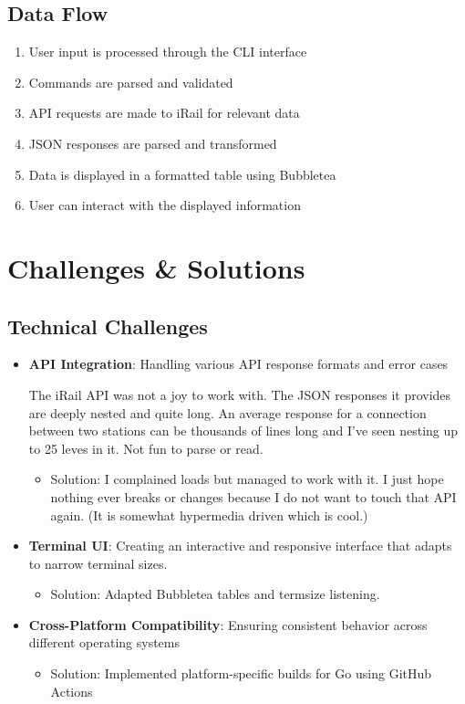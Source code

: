 \documentclass[10pt,a4paper]{article}
\begin{document}
\subsection{Data Flow}
\begin{enumerate}
	\item User input is processed through the CLI interface
	\item Commands are parsed and validated
	\item API requests are made to iRail for relevant data
	\item JSON responses are parsed and transformed
	\item Data is displayed in a formatted table using Bubbletea
	\item User can interact with the displayed information
\end{enumerate}

\section{Challenges \& Solutions}
\subsection{Technical Challenges}
\begin{itemize}
	\item \textbf{API Integration}: Handling various API response formats and error cases

	      The iRail API was not a joy to work with. The JSON responses it provides are deeply nested and quite long. An average response for a connection between two stations can be thousands of lines long and I've seen nesting up to 25 leves in it. Not
	      fun to parse or read.
	      \begin{itemize}
		      \item Solution: I complained loads but managed to work with it. I just hope nothing ever breaks or changes because I do not want to touch that API again. (It is somewhat hypermedia driven which is cool.)
	      \end{itemize}
	\item \textbf{Terminal UI}: Creating an interactive and responsive interface that adapts to narrow terminal sizes.
	      \begin{itemize}
		      \item Solution: Adapted Bubbletea tables and termsize listening.
	      \end{itemize}
	\item \textbf{Cross-Platform Compatibility}: Ensuring consistent behavior across different operating systems
	      \begin{itemize}
		      \item Solution: Implemented platform-specific builds for Go using GitHub Actions
	      \end{itemize}
\end{itemize}
\end{document}
